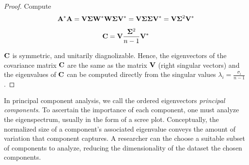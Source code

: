 \begin{proof}
  Compute
  \[
    \mathbf{A}^*\mathbf{A} =
    \mathbf{V\Sigma}\mathbf{W}^*\mathbf{W\Sigma}\mathbf{V}^* =
    \mathbf{V\Sigma\Sigma}\mathbf{V}^* =
    \mathbf{V}\mathbf{\Sigma}^2\mathbf{V}^*
  \]

  \[
    \mathbf{C} = \mathbf{V}\frac{\mathbf{\Sigma}^2}{n - 1}\mathbf{V}^*
  \]

  $\mathbf{C}$ is symmetric, and unitarily diagnolizable.  Hence, the eigenvectors of the covariance matrix $\mathbf{C}$ are the same as the
  matrix $\mathbf{V}$ (right singular vectors) and the eigenvalues of $\mathbf{C}$ can be computed directly from the singular values
  $\lambda_i = \frac{\sigma_i}{n - 1}$.
\end{proof}

In principal component analysis, we call the ordered eigenvectors \textit{principal components}.  To ascertain the importance of each
component, one must analyze the \gls{eigenspectrum}, usually in the form of a \gls{scree plot}.  Conceptually, the normalized size of a component's
associated eigenvalue conveys the amount of variation that component captures.  A researcher can the choose a suitable subset of components to
analyze, reducing the dimensionality of the dataset the chosen components.


